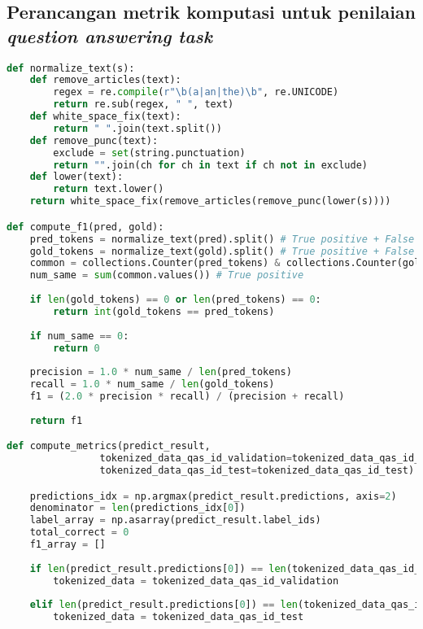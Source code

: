 \subsection{Perancangan metrik komputasi untuk penilaian \emph{question answering task}}
\begin{lstlisting}[language=Python, caption=Perancangan metrik komputasi untuk penilaian \emph{question answering task}]
def normalize_text(s):
    def remove_articles(text):
        regex = re.compile(r"\b(a|an|the)\b", re.UNICODE)
        return re.sub(regex, " ", text)
    def white_space_fix(text):
        return " ".join(text.split())
    def remove_punc(text):
        exclude = set(string.punctuation)
        return "".join(ch for ch in text if ch not in exclude)
    def lower(text):
        return text.lower()
    return white_space_fix(remove_articles(remove_punc(lower(s))))

def compute_f1(pred, gold):
    pred_tokens = normalize_text(pred).split() # True positive + False positive = Untuk precision
    gold_tokens = normalize_text(gold).split() # True positive + False negatives = Untuk recall
    common = collections.Counter(pred_tokens) & collections.Counter(gold_tokens)
    num_same = sum(common.values()) # True positive
    
    if len(gold_tokens) == 0 or len(pred_tokens) == 0: 
        return int(gold_tokens == pred_tokens)
    
    if num_same == 0:
        return 0
    
    precision = 1.0 * num_same / len(pred_tokens)
    recall = 1.0 * num_same / len(gold_tokens)
    f1 = (2.0 * precision * recall) / (precision + recall)
    
    return f1

def compute_metrics(predict_result, 
                tokenized_data_qas_id_validation=tokenized_data_qas_id_validation, 
                tokenized_data_qas_id_test=tokenized_data_qas_id_test):

    predictions_idx = np.argmax(predict_result.predictions, axis=2)
    denominator = len(predictions_idx[0])
    label_array = np.asarray(predict_result.label_ids)
    total_correct = 0
    f1_array = []
    
    if len(predict_result.predictions[0]) == len(tokenized_data_qas_id_validation):
        tokenized_data = tokenized_data_qas_id_validation
    
    elif len(predict_result.predictions[0]) == len(tokenized_data_qas_id_test):
        tokenized_data = tokenized_data_qas_id_test


\end{lstlisting}
